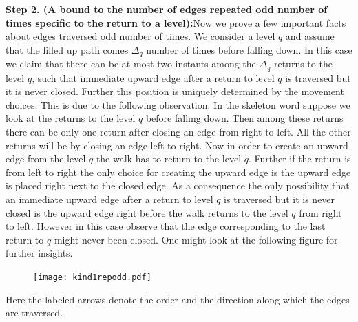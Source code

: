 \documentclass[12pt]{article}
\numberwithin{equation}{section}
\numberwithin{equation}{section}
\theoremstyle{definition}
\renewcommand{\1}{\bf 1}
\begin{document}
\noindent
\textbf{Step 2. (A bound to the number of edges repeated odd number of times specific to the return to a level):}Now we prove a few important facts about edges traversed odd number of times. We consider a level $q$ and assume that the filled up path comes $\Delta_{q}$ number of times before falling down. In this case we claim that there can be at most two instants among the $\Delta_{q}$ returns to the level $q$, such that immediate upward edge after a return to level $q$ is traversed but it is never closed. Further this position is uniquely determined by the movement choices. This is due to the following observation. In the skeleton word suppose we look at the returns to the level $q$ before falling down. Then among these returns there can be only one return after closing an edge from right to left. All the other returns will be by closing an edge left to right. Now in order to create an upward edge from the level $q$ the walk has to return to the level $q$. Further if the return is from left to right the only choice for creating the upward edge is the upward edge is placed right next to the closed edge. As a consequence the only possibility that an immediate upward edge after a return to level $q$ is traversed but it is never closed is the upward edge right before the walk returns to the level $q$ from right to left. However in this case observe that the edge corresponding to the last return to $q$ might never been closed. One might look at the following figure for further insights. 
\begin{figure}[H]
        \begin{center}
                \texttt{[image: kind1repodd.pdf]}
        ~ %
      \end{center}   
 \end{figure}
Here the labeled arrows denote the order and the direction along which the edges are traversed.
\end{document}
